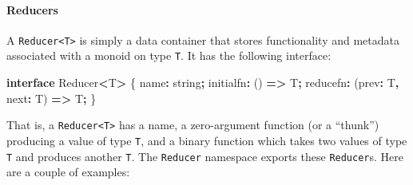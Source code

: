 \documentclass[
  openany]{book}
\newenvironment{Shaded}{\begin{snugshade}}{\end{snugshade}}
\newcommand{\DataTypeTok}[1]{\textcolor[rgb]{0.13,0.29,0.53}{#1}}
\newcommand{\KeywordTok}[1]{\textcolor[rgb]{0.13,0.29,0.53}{\textbf{#1}}}
\newcommand{\NormalTok}[1]{#1}
\newcommand{\OperatorTok}[1]{\textcolor[rgb]{0.81,0.36,0.00}{\textbf{#1}}}
\theoremstyle{definition}
\theoremstyle{definition}
\theoremstyle{definition}
\theoremstyle{definition}
\theoremstyle{remark}
\begin{document}
\paragraph{Reducers}\label{reducers}

A \texttt{Reducer\textless{}T\textgreater{}} is simply a data container that stores functionality and metadata associated with a monoid on type \texttt{T}. It has the following interface:

\begin{Shaded}
\begin{Highlighting}[]
\KeywordTok{interface}\NormalTok{ Reducer}\OperatorTok{\textless{}}\NormalTok{T}\OperatorTok{\textgreater{}}\NormalTok{ \{}
\NormalTok{  name}\OperatorTok{:} \DataTypeTok{string}\OperatorTok{;}
\NormalTok{  initialfn}\OperatorTok{:}\NormalTok{ () }\KeywordTok{=\textgreater{}}\NormalTok{ T}\OperatorTok{;}
\NormalTok{  reducefn}\OperatorTok{:}\NormalTok{ (prev}\OperatorTok{:}\NormalTok{ T}\OperatorTok{,}\NormalTok{ next}\OperatorTok{:}\NormalTok{ T) }\KeywordTok{=\textgreater{}}\NormalTok{ T}\OperatorTok{;}
\NormalTok{\}}
\end{Highlighting}
\end{Shaded}

That is, a \texttt{Reducer\textless{}T\textgreater{}} has a name, a zero-argument function (or a ``thunk'') producing a value of type \texttt{T}, and a binary function which takes two values of type \texttt{T} and produces another \texttt{T}. The \texttt{Reducer} namespace exports these \texttt{Reducer}s. Here are a couple of examples:
\end{document}
